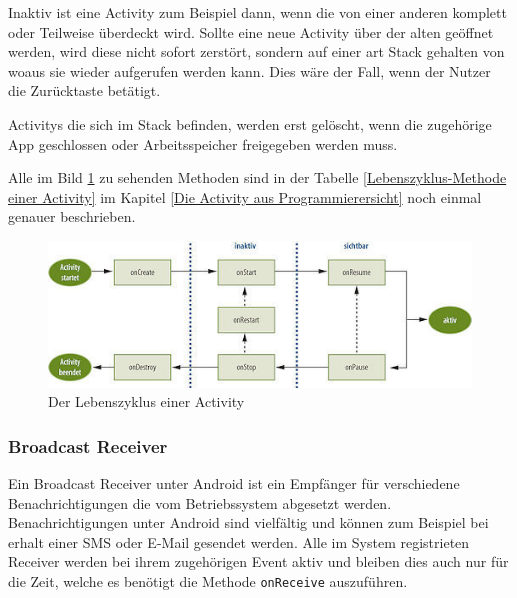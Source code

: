 Inaktiv ist eine Activity zum Beispiel dann, wenn die von einer anderen komplett oder Teilweise \"uberdeckt wird. Sollte eine neue Activity \"uber der alten ge\"offnet werden, wird diese nicht sofort zerst\"ort, sondern auf einer art Stack gehalten von woaus sie wieder aufgerufen werden kann. Dies w\"are der Fall, wenn der Nutzer die Zur\"ucktaste bet\"atigt.

Activitys die sich im Stack befinden, werden erst gel\"oscht, wenn die zugeh\"orige App geschlossen oder Arbeitsspeicher freigegeben werden muss. 

Alle im Bild \ref{ActivityLebenszyklus} zu sehenden Methoden sind in der Tabelle \ref{Lebenszyklus-Methode einer Activity} im Kapitel \ref{Die Activity aus Programmierersicht} noch einmal genauer beschrieben.

\begin{figure}[!ht]
\centering
\includegraphics[width=14cm]{Bilder/ActivityLifecycle}
\caption{Der Lebenszyklus einer Activity \cite{ActivityLifecycle}}
\label{ActivityLebenszyklus}
\centering
\end{figure}
\FloatBarrier


\subsubsection{Broadcast Receiver} \label{Broadcast Receiver aus Nutzersicht}
Ein Broadcast Receiver unter Android ist ein Empf\"anger f\"ur verschiedene Benachrichtigungen die vom Betriebssystem abgesetzt werden. Benachrichtigungen unter Android sind vielf\"altig und k\"onnen zum Beispiel bei erhalt einer SMS oder E-Mail gesendet werden. Alle im System registrieten Receiver werden bei ihrem zugeh\"origen Event aktiv und bleiben dies auch nur f\"ur die Zeit, welche es ben\"otigt die Methode \texttt{onReceive} auszuf\"uhren.

